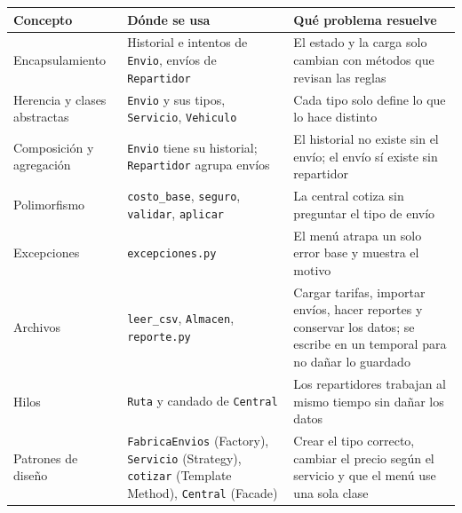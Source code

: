 \documentclass[11pt]{article}
\begin{document}
\begin{center}
\small
\renewcommand{\arraystretch}{1.3}
\begin{tabular}{|>{\raggedright\arraybackslash}p{3cm}|>{\raggedright\arraybackslash}p{5cm}|>{\raggedright\arraybackslash}p{5.3cm}|}
\hline
\textbf{Concepto} & \textbf{Dónde se usa} & \textbf{Qué problema resuelve} \\ \hline
Encapsulamiento & Historial e intentos de \texttt{Envio}, envíos de \texttt{Repartidor} & El estado y la carga solo cambian con métodos que revisan las reglas \\ \hline
Herencia y clases abstractas & \texttt{Envio} y sus tipos, \texttt{Servicio}, \texttt{Vehiculo} & Cada tipo solo define lo que lo hace distinto \\ \hline
Composición y agregación & \texttt{Envio} tiene su historial; \texttt{Repartidor} agrupa envíos & El historial no existe sin el envío; el envío sí existe sin repartidor \\ \hline
Polimorfismo & \texttt{costo\_base}, \texttt{seguro}, \texttt{validar}, \texttt{aplicar} & La central cotiza sin preguntar el tipo de envío \\ \hline
Excepciones & \texttt{excepciones.py} & El menú atrapa un solo error base y muestra el motivo \\ \hline
Archivos & \texttt{leer\_csv}, \texttt{Almacen}, \texttt{reporte.py} & Cargar tarifas, importar envíos, hacer reportes y conservar los datos; se escribe en un temporal para no dañar lo guardado \\ \hline
Hilos & \texttt{Ruta} y candado de \texttt{Central} & Los repartidores trabajan al mismo tiempo sin dañar los datos \\ \hline
Patrones de diseño & \texttt{FabricaEnvios} (Factory), \texttt{Servicio} (Strategy), \texttt{cotizar} (Template Method), \texttt{Central} (Facade) & Crear el tipo correcto, cambiar el precio según el servicio y que el menú use una sola clase \\ \hline
\end{tabular}
\end{center}
\end{document}
